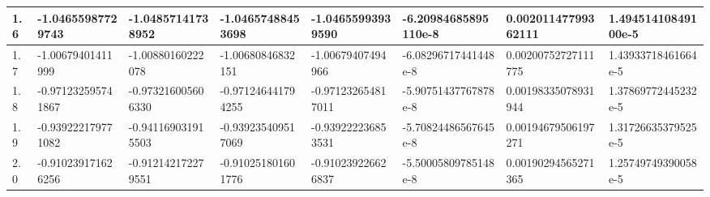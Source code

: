 \documentclass[12pt,b4paper,landscape]{memoir}
\begin{document}
\begin{table}[]
\begin{tabular}{|l|l|l|l|l|l|l|l|}
1.6                                                      & -1.04655987729743           & \multicolumn{1}{l|}{-1.04857141738952}  & -1.04657488453698       & -1.04655993939590  & -6.20984685895110e-8   & 0.00201147799362111           & 1.49451410849100e-5           \\ \hline
1.7                                                      & -1.00679401411999            & \multicolumn{1}{l|}{-1.00880160222078}  & -1.00680846832151       & -1.00679407494966  & -6.08296717441448e-8   & 0.00200752727111775           & 1.43933718461664e-5           \\ \hline
1.8                                                      & -0.971232595741867           & \multicolumn{1}{l|}{-0.973216005606330} & -0.971246441794255      & -0.971232654817011 & -5.90751437767878e-8   & 0.00198335078931944           & 1.37869772445232e-5           \\ \hline
1.9                                                      & -0.939222179771082           & \multicolumn{1}{l|}{-0.941169031915503} & -0.939235409517069      & -0.939222236853531 & -5.70824486567645e-8   & 0.00194679506197271           & 1.31726635379525e-5           \\ \hline
2.0                                                      & -0.910239171626256           & \multicolumn{1}{l|}{-0.912142172279551} & -0.910251801601776      & -0.910239226626837 & -5.50005809785148e-8  & 0.00190294565271365           & 1.25749749390058e-5           \\ \hline
\end{tabular}
\end{table}
\end{document}
